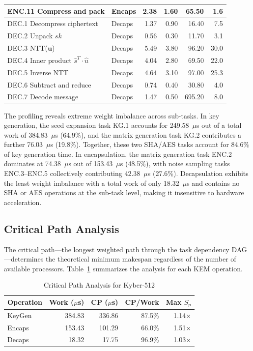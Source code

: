 \documentclass[journal]{IEEEtran}
\begin{document}
\begin{table}[!t]
\begin{tabular}{l l r r r r}
ENC.11 Compress and pack & Encaps & 2.38 & 1.60 & 65.50 & 1.6 \\
\midrule
DEC.1 Decompress ciphertext & Decaps & 1.37 & 0.90 & 16.40 & 7.5 \\
DEC.2 Unpack $sk$ & Decaps & 0.56 & 0.30 & 11.70 & 3.1 \\
DEC.3 NTT($\mathbf{u}$) & Decaps & 5.49 & 3.80 & 96.20 & 30.0 \\
DEC.4 Inner product $\hat{s}^T \cdot \hat{u}$ & Decaps & 4.04 & 2.80 & 69.50 & 22.0 \\
DEC.5 Inverse NTT & Decaps & 4.64 & 3.10 & 97.00 & 25.3 \\
DEC.6 Subtract and reduce & Decaps & 0.74 & 0.40 & 30.80 & 4.0 \\
DEC.7 Decode message & Decaps & 1.47 & 0.50 & 695.20 & 8.0 \\
\bottomrule
\end{tabular}
\end{table}

The profiling reveals extreme weight imbalance across sub-tasks. In key generation, the seed expansion task KG.1 accounts for 249.58~$\mu$s out of a total work of 384.83~$\mu$s (64.9\%), and the matrix generation task KG.2 contributes a further 76.03~$\mu$s (19.8\%). Together, these two SHA/AES tasks account for 84.6\% of key generation time. In encapsulation, the matrix generation task ENC.2 dominates at 74.38~$\mu$s out of 153.43~$\mu$s (48.5\%), with noise sampling tasks ENC.3--ENC.5 collectively contributing 42.38~$\mu$s (27.6\%). Decapsulation exhibits the least weight imbalance with a total work of only 18.32~$\mu$s and contains no SHA or AES operations at the sub-task level, making it insensitive to hardware acceleration.

\subsection{Critical Path Analysis}

The critical path---the longest weighted path through the task dependency DAG---determines the theoretical minimum makespan regardless of the number of available processors. Table~\ref{tab:critical_path} summarizes the analysis for each KEM operation.

\begin{table}[!t]
\renewcommand{\arraystretch}{1.15}
\caption{Critical Path Analysis for Kyber-512}
\label{tab:critical_path}
\centering
\begin{tabular}{l r r r r}
\toprule
\textbf{Operation} & \textbf{Work ($\mu$s)} & \textbf{CP ($\mu$s)} & \textbf{CP/Work} & \textbf{Max $S_p$} \\
\midrule
KeyGen & 384.83 & 336.86 & 87.5\% & 1.14$\times$ \\
Encaps & 153.43 & 101.29 & 66.0\% & 1.51$\times$ \\
Decaps &  18.32 &  17.75 & 96.9\% & 1.03$\times$ \\
\bottomrule
\end{tabular}
\end{table}
\end{document}

